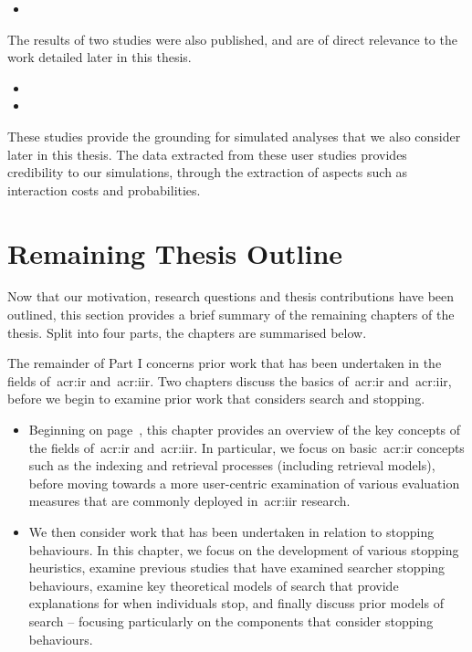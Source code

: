 \begin{itemize}
    \item{}
\end{itemize}

The results of two studies were also published, and are of direct relevance to the work detailed later in this thesis.

\begin{itemize}
    \item{}
    \item{}
\end{itemize}

These studies provide the grounding for simulated analyses that we also consider later in this thesis. The data extracted from these user studies provides credibility to our simulations, through the extraction of aspects such as interaction costs and probabilities.

\section{Remaining Thesis Outline}
Now that our motivation, research questions and thesis contributions have been outlined, this section provides a brief summary of the remaining chapters of the thesis. Split into four parts, the chapters are summarised below.

\noindent
{}
The remainder of Part I concerns prior work that has been undertaken in the fields of~\gls{acr:ir} and~\gls{acr:iir}. Two chapters discuss the basics of~\gls{acr:ir} and~\gls{acr:iir}, before we begin to examine prior work that considers search and stopping.

\begin{itemize}
    \item[]{} Beginning on page~\pageref{chap:ir_background}, this chapter provides an overview of the key concepts of the fields of~\gls{acr:ir} and~\gls{acr:iir}. In particular, we focus on basic~\gls{acr:ir} concepts such as the indexing and retrieval processes (including retrieval models), before moving towards a more user-centric examination of various evaluation measures that are commonly deployed in~\gls{acr:iir} research.
    
    \item[]{} We then consider work that has been undertaken in relation to stopping behaviours. In this chapter, we focus on the development of various stopping heuristics, examine previous studies that have examined searcher stopping behaviours, examine key theoretical models of search that provide explanations for when individuals stop, and finally discuss prior models of search -- focusing particularly on the components that consider stopping behaviours. 
\end{itemize}

